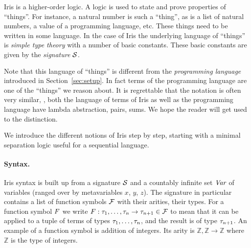 Iris is a higher-order logic.
A logic is used to state and prove properties of ``things''.
For instance, a natural number is such a ``thing'', as is a list of natural numbers, a value of a programming language, etc.
These things need to be written in some language.
In the case of Iris the underlying language of ``things'' is \emph{simple type theory} with a number of basic constants.
These basic constants are given by the \emph{signature} $\mathcal{S}$.

Note that this language of ``things'' is different from the \emph{programming language} introduced in Section~\ref{sec:setup}.
In fact terms of the programming language are one of the ``things'' we reason about.
It is regrettable that the notation is often very similar, \eg{}, both the language of terms of Iris as well as the programming language have lambda abstraction, pairs, sums.
We hope the reader will get used to the distinction.

We introduce the different notions of Iris step by step, starting with a minimal separation logic useful for a sequential language.
\paragraph{Syntax.}
Iris syntax is built up from a signature $\mathcal{S}$ and a countably infinite set $\textit{Var}$ of variables (ranged over by metavariables $x$, $y$, $z$).
The signature in particular contains a list of function symbols $\mathcal{F}$ with their arities, \ie{} their types.
For a function symbol $F$ we write $F : \tau_1, \dots, \tau_n \to \tau_{n+1} \in \mathcal{F}$ to mean that it can be applied to a tuple of terms of types $\tau_1, \dots, \tau_n$, and the result is of type $\tau_{n+1}$.
An example of a function symbol is addition of integers.
Its arity is $\mathbb{Z}, \mathbb{Z} \to \mathbb{Z}$ where $\mathbb{Z}$ is the type of integers.

